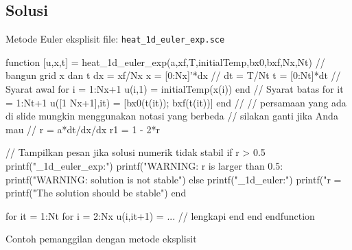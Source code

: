 \documentclass[10pt,bahasa]{article}
\begin{document}
\subsection*{Solusi}

Metode Euler eksplisit file: \verb|heat_1d_euler_exp.sce|

\begin{scilabcode}
function [u,x,t] = heat_1d_euler_exp(a,xf,T,initialTemp,bx0,bxf,Nx,Nt)
  // bangun grid x dan t
  dx = xf/Nx
  x  = [0:Nx]'*dx
  //
  dt = T/Nt
  t  = [0:Nt]*dt
  // Syarat awal
  for i = 1:Nx+1
    u(i,1) = initialTemp(x(i))
  end
  // Syarat batas
  for it = 1:Nt+1
    u([1 Nx+1],it) = [bx0(t(it)); bxf(t(it))]
  end
  //
  // persamaan yang ada di slide mungkin menggunakan notasi yang berbeda
  // silakan ganti jika Anda mau
  //
  r  = a*dt/dx/dx
  r1 = 1 - 2*r
  
  // Tampilkan pesan jika solusi numerik tidak stabil
  if r > 0.5
    printf("\nheat_1d_euler_exp:\n")
    printf("WARNING: r is larger than 0.5: %
    printf("WARNING: solution is not stable\n\n")
  else
    printf("\nheat_1d_euler:\n")
    printf("r = %
    printf("The solution should be stable\n\n")
  end
  
  for it = 1:Nt
    for i = 2:Nx
      u(i,it+1) = ... // lengkapi
    end
  end
endfunction  
\end{scilabcode}

Contoh pemanggilan dengan metode eksplisit
\end{document}
